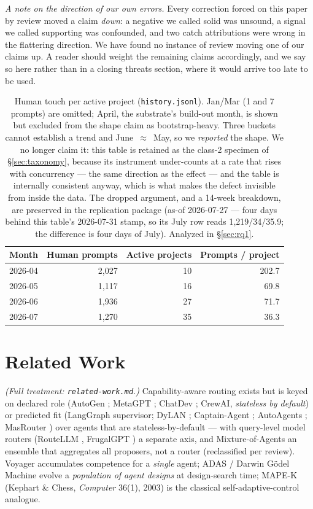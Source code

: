 \documentclass[10pt,conference]{IEEEtran}   %
\begin{document}
\emph{A note on the direction of our own errors.} Every correction forced on this paper by review
moved a claim \emph{down}: a negative we called solid was unsound, a signal we called supporting was
confounded, and two catch attributions were wrong in the flattering direction. We have found no
instance of review moving one of our claims up. A reader should weight the remaining claims
accordingly, and we say so here rather than in a closing threats section, where it would arrive too
late to be used.

\begin{table}[t]
\centering\footnotesize
\caption{Human touch per active project (\texttt{history.jsonl}). Jan/Mar (1 and 7 prompts) are
omitted; April, the substrate's build-out month, is shown but excluded from the shape claim as
bootstrap-heavy. Three buckets cannot
establish a trend and June~$\approx$~May, so we \emph{reported} the shape. We no longer claim it: this table is
retained as the class-2 specimen of \S\ref{sec:taxonomy}, because its instrument under-counts at a
rate that rises with concurrency --- the same direction as the effect --- and the table is
internally consistent anyway, which is what makes the defect invisible from inside the data.
The dropped argument, and a 14-week
breakdown, are preserved in the replication package (as-of 2026-07-27 --- four days behind this table's
2026-07-31 stamp, so its July row reads 1{,}219/34/35.9; the difference is four days of July).
Analyzed in \S\ref{sec:rq1}.}
\label{tab:touch}
\begin{tabular}{lrrr}
\toprule
Month & Human prompts & Active projects & Prompts / project \\
\midrule
2026-04 & 2{,}027 & 10 & 202.7 \\
2026-05 & 1{,}117 & 16 & 69.8 \\
2026-06 & 1{,}936 & 27 & 71.7 \\
2026-07 & 1{,}270 & 35 & 36.3 \\
\bottomrule
\end{tabular}
\end{table}

\section{Related Work}
\label{sec:related}
\emph{(Full treatment: \texttt{related-work.md}.)} Capability-aware routing exists but is
keyed on declared role (AutoGen \cite{autogen}; MetaGPT \cite{metagpt}; ChatDev
\cite{chatdev}; CrewAI,
\emph{stateless by default}) or predicted fit (LangGraph supervisor; DyLAN
\cite{dylan}; Captain-Agent \cite{captainagent}; AutoAgents \cite{autoagents}; MasRouter
\cite{masrouter}) over agents that are stateless-by-default --- with query-level
model routers (RouteLLM \cite{routellm}, FrugalGPT \cite{frugalgpt}) a separate axis, and
Mixture-of-Agents \cite{moa} an ensemble that aggregates all proposers, not a router
(reclassified per review). Voyager \cite{voyager} accumulates competence for a \emph{single}
agent; ADAS \cite{adas} / Darwin G\"{o}del Machine \cite{dgm} evolve a \emph{population of
agent designs} at design-search time; MAPE-K (Kephart \& Chess, \emph{Computer}
36(1), 2003) \cite{mapek} is the classical self-adaptive-control analogue.
\end{document}
